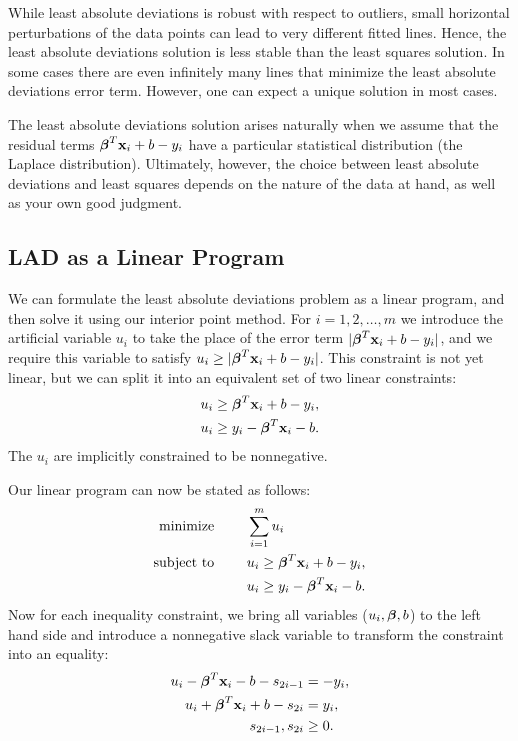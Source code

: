 While least absolute deviations is robust with respect to outliers, small horizontal perturbations of the data points can lead to very different fitted lines.
Hence, the least absolute deviations solution is less stable than the least squares solution.
In some cases there are even infinitely many lines that minimize the least absolute deviations error term.
However, one can expect a unique solution in most cases.

The least absolute deviations solution arises naturally when we assume that the residual terms $\boldsymbol{\beta}^T\mathbf{x}_i + b - y_i$ have a particular statistical distribution (the Laplace distribution).
Ultimately, however, the choice between least absolute deviations and least squares depends on the nature of the data at hand, as well as your own good judgment.


\subsection*{LAD as a Linear Program}
We can formulate the least absolute deviations problem as a linear program, and then solve it using our interior point method.
For $i = 1, 2, \ldots, m$ we introduce the artificial variable $u_i$ to take the place of the error term $|\boldsymbol{\beta}^T\mathbf{x}_i + b - y_i|$, and we require this variable to satisfy $u_i \geq |\boldsymbol{\beta}^T\mathbf{x}_i + b - y_i|$.
This constraint is not yet linear, but we can split it into an equivalent set of two linear constraints:
\begin{align*}
u_i &\geq \boldsymbol{\beta}^T\mathbf{x}_i + b - y_i,\\
u_i &\geq y_i - \boldsymbol{\beta}^T\mathbf{x}_i - b.
\end{align*}
The $u_i$ are implicitly constrained to be nonnegative.

Our linear program can now be stated as follows:
\begin{align*}
\text{minimize }\qquad &\sum_{i=1}^m u_i\\
\text{subject to }\qquad &u_i \geq \boldsymbol{\beta}^T\mathbf{x}_i + b - y_i,\\
&u_i \geq y_i - \boldsymbol{\beta}^T\mathbf{x}_i - b.
\end{align*}
Now for each inequality constraint, we bring all variables ($u_i, \boldsymbol{\beta}, b$) to the left hand side and introduce a nonnegative slack variable to transform the constraint into an equality:
\begin{align*}
u_i  - \boldsymbol{\beta}^T\mathbf{x}_i - b - s_{2i-1}&= -y_i,\\
u_i +\boldsymbol{\beta}^T\mathbf{x}_i + b - s_{2i}&= y_i,\\
s_{2i-1}, s_{2i}&\geq 0.
\end{align*}

